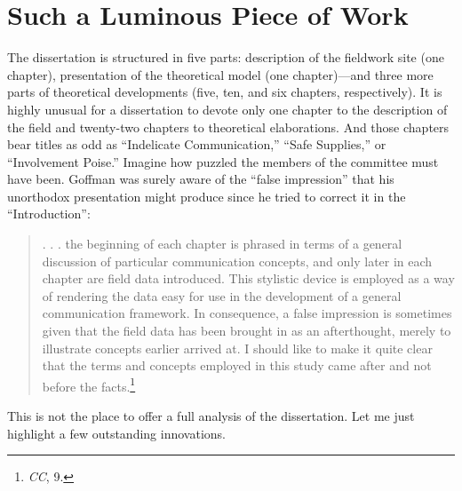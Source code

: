 \documentclass[twoside,symmetric,nobib,justified]{tufte-book}
\begin{document}
\hypertarget{such-a-luminous-piece-of-work}{%
\section{Such a Luminous Piece of
Work}\label{such-a-luminous-piece-of-work}}

The dissertation is structured in five parts: description of the
fieldwork site (one chapter), presentation of the theoretical model (one
chapter)---and three more parts of theoretical developments (five, ten,
and six chapters, respectively). It is highly unusual for a dissertation
to devote only one chapter to the description of the field and
twenty-two chapters to theoretical elaborations. And those chapters bear
titles as odd as ``Indelicate Communication,'' ``Safe Supplies,'' or
``Involvement Poise.'' Imagine how puzzled the members of the committee
must have been. Goffman was surely aware of the ``false impression''
that his unorthodox presentation might produce since he tried to correct
it in the ``Introduction'':

\begin{quote}
. . . the beginning of each chapter is phrased in terms of a general
discussion of particular communication concepts, and only later in each
chapter are field data introduced. This stylistic device is employed as
a way of rendering the data easy for use in the development of a general
communication framework. In consequence, a false impression is sometimes
given that the field data has been brought in as an afterthought, merely
to illustrate concepts earlier arrived at. I should like to make it
quite clear that the terms and concepts employed in this study came
after and not before the facts.\footnote{\emph{CC}, 9.}
\end{quote}

\noindent This is not the place to offer a full analysis of the dissertation. Let
me just highlight a few outstanding innovations.
\end{document}
